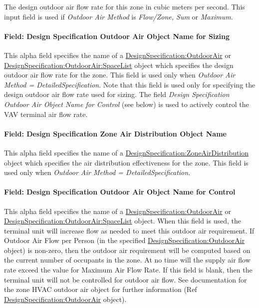 The design outdoor air flow rate for this zone in cubic meters per second. This input field is used if \emph{Outdoor Air Method} is \emph{Flow/Zone, Sum} or \emph{Maximum}.

\paragraph{Field: Design Specification Outdoor Air Object Name for Sizing}\label{field-design-specification-outdoor-air-object-name-for-sizing-2}

This alpha field specifies the name of a \hyperref[designspecificationoutdoorair]{DesignSpecification:OutdoorAir} or \hyperref[designspecificationoutdoorairspacelist]{DesignSpecification:OutdoorAir:SpaceList} object which specifies the design outdoor air flow rate for the zone. This field is used only when \emph{Outdoor Air Method = DetailedSpecification}. Note that this field is used only for specifying the design outdoor air flow rate used for sizing. The field \emph{Design Specification Outdoor Air Object Name for Control} (see below) is used to actively control the VAV terminal air flow rate.

\paragraph{Field: Design Specification Zone Air Distribution Object Name}\label{field-design-specification-zone-air-distribution-object-name-11}

This alpha field specifies the name of a \hyperref[designspecificationzoneairdistribution]{DesignSpecification:ZoneAirDistribution} object which specifies the air distribution effectiveness for the zone. This field is used only when \emph{Outdoor Air Method = DetailedSpecification}.

\paragraph{Field: Design Specification Outdoor Air Object Name for Control}\label{field-design-specification-outdoor-air-object-name-for-control-1}

This alpha field specifies the name of a \hyperref[designspecificationoutdoorair]{DesignSpecification:OutdoorAir} or \hyperref[designspecificationoutdoorairspacelist]{DesignSpecification:OutdoorAir:SpaceList} object. When this field is used, the terminal unit will increase flow as needed to meet this outdoor air requirement. If Outdoor Air Flow per Person (in the specified \hyperref[designspecificationoutdoorair]{DesignSpecification:OutdoorAir} object) is non-zero, then the outdoor air requirement will be computed based on the current number of occupants in the zone. At no time will the supply air flow rate exceed the value for Maximum Air Flow Rate. If this field is blank, then the terminal unit will not be controlled for outdoor air flow. See documentation for the zone HVAC outdoor air object for further information (Ref \hyperref[designspecificationoutdoorair]{DesignSpecification:OutdoorAir} object).


